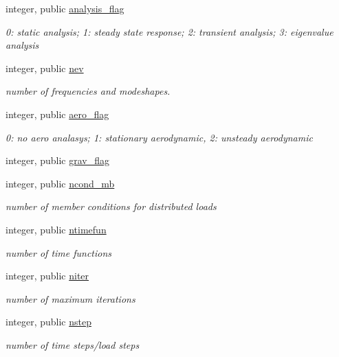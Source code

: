 \begin{DoxyCompactItemize}
integer, public \hyperlink{namespaceioaero_a435527b09d62e7aac9883e1a6d6f3438}{analysis\+\_\+flag}
\begin{DoxyCompactList}\small\item\em 0\+: static analysis; 1\+: steady state response; 2\+: transient analysis; 3\+: eigenvalue analysis \end{DoxyCompactList}\item 
integer, public \hyperlink{namespaceioaero_a1216c8699aea9eb27e3d795cc9d8d271}{nev}
\begin{DoxyCompactList}\small\item\em number of frequencies and modeshapes. \end{DoxyCompactList}\item 
integer, public \hyperlink{namespaceioaero_afb280b6ca8de323c9a07076df81a71e1}{aero\+\_\+flag}
\begin{DoxyCompactList}\small\item\em 0\+: no aero analasys; 1\+: stationary aerodynamic, 2\+: unsteady aerodynamic \end{DoxyCompactList}\item 
integer, public \hyperlink{namespaceioaero_a831fe87d45ef05e3e29a8c4c2fc88c8f}{grav\+\_\+flag}
\item 
integer, public \hyperlink{namespaceioaero_ab9193f4ff70a22ae5858118fc653f22b}{ncond\+\_\+mb}
\begin{DoxyCompactList}\small\item\em number of member conditions for distributed loads \end{DoxyCompactList}\item 
integer, public \hyperlink{namespaceioaero_a8d0cfe1f4a5677d76ba3f3e775b12d1e}{ntimefun}
\begin{DoxyCompactList}\small\item\em number of time functions \end{DoxyCompactList}\item 
integer, public \hyperlink{namespaceioaero_ac008486fd12e0029a1ef77b3ca5e12c3}{niter}
\begin{DoxyCompactList}\small\item\em number of maximum iterations \end{DoxyCompactList}\item 
integer, public \hyperlink{namespaceioaero_ab078a397454a22b07a19ae3a7443a561}{nstep}
\begin{DoxyCompactList}\small\item\em number of time steps/load steps \end{DoxyCompactList}\item 

\end{DoxyCompactItemize}
